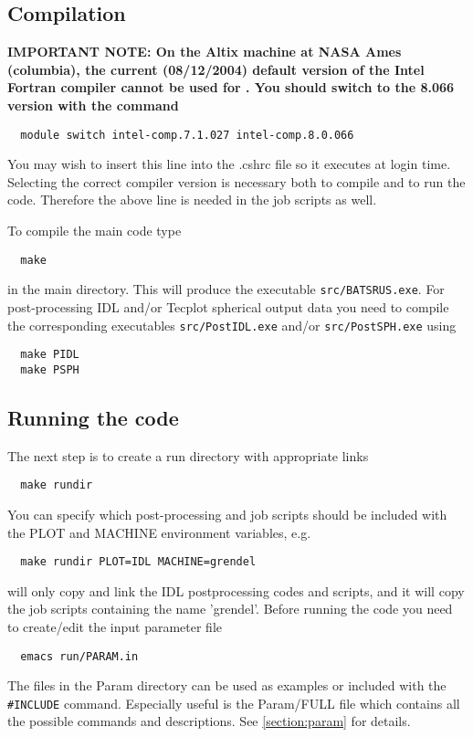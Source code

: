 \subsection{Compilation}

{\bf IMPORTANT NOTE:
On the Altix machine at NASA Ames (columbia),
the current (08/12/2004) 
default version of the Intel Fortran compiler 
cannot be used for \BATSRUS. 
You should switch to the 8.066 version with the command
\begin{verbatim}
  module switch intel-comp.7.1.027 intel-comp.8.0.066
\end{verbatim}
You may wish to insert this line into the .cshrc file
so it executes at login time. 
Selecting the correct compiler version is 
necessary both to compile and to run the code.
Therefore the above line is needed in the job scripts
as well.}

To compile the main code type
\begin{verbatim}
  make
\end{verbatim}
in the main directory. This will produce the executable 
{\tt src/BATSRUS.exe}. For post-processing IDL and/or 
Tecplot spherical output data 
you need to compile the corresponding executables {\tt src/PostIDL.exe}
and/or {\tt src/PostSPH.exe} using
\begin{verbatim}
  make PIDL
  make PSPH
\end{verbatim}

\subsection{Running the code}

The next step is to create a run directory with appropriate links
\begin{verbatim}
  make rundir
\end{verbatim}
You can specify which post-processing and job scripts should be
included with the PLOT and MACHINE environment variables, e.g.
\begin{verbatim}
  make rundir PLOT=IDL MACHINE=grendel
\end{verbatim}
will only copy and link the IDL postprocessing codes and scripts,
and it will copy the job scripts containing the name 'grendel'.
Before running the code you need to create/edit the input
parameter file
\begin{verbatim}
  emacs run/PARAM.in
\end{verbatim}
The files in the Param directory can be used as examples or included
with the {\tt \#INCLUDE} command.
Especially useful is the Param/FULL file which contains
all the possible commands and descriptions.
See \ref{section:param} for details.

